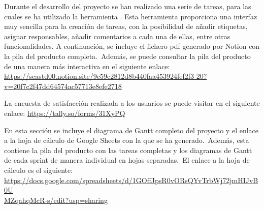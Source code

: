 


Durante el desarrollo del proyecto se han realizado una serie de tareas, para las cuales se ha utilizado la
herramienta .
Esta herramienta proporciona una interfaz muy sencilla para la creación de tareas, con la
posibilidad de añadir etiquetas, asignar responsables, añadir comentarios a cada una de ellas,
entre otras funcionalidades.
A continuación, se incluye el fichero pdf generado por Notion con la pila del producto completa.\ Además, se puede
consultar la pila del producto de una manera más interactiva en el siguiente enlace:
\href{https://scastd00.notion.site/9c59c2812d8b440faa453924fef2f320?v=20f7c2f47dd64574ac57713e8efe2718}
{https://scastd00.notion.site/9c59c2812d8b440faa453924fef2f3
20?v=20f7c2f47dd64574ac57713e8efe2718}

\label{anx:product-backlog-notion}




La encuesta de satisfacción realizada a los usuarios se puede visitar en el siguiente enlace:
\href{https://tally.so/forms/31XyPQ}{https://tally.so/forms/31XyPQ}
\label{anx:encuesta-satisfaccion}



En esta sección se incluye el diagrama de Gantt completo del proyecto y el enlace a la hoja de cálculo de Google
Sheets con la que se ha generado.\ Además, esta contiene la pila del producto con las tareas completas y los diagramas
de Gantt de cada sprint de manera individual en hojas separadas.\ El enlace a la hoja de cálculo es el siguiente:
\href{https://docs.google.com/spreadsheets/d/1GOffJpsR0vORsQYvTrbWj72jmHIJvB0UMZqahqMcR-s/edit?usp=sharing}
{https://docs.google.com/spreadsheets/d/1GOffJpsR0vORsQYvTrbWj72jmHIJvB0U\\MZqahqMcR-s/edit?usp=sharing}

